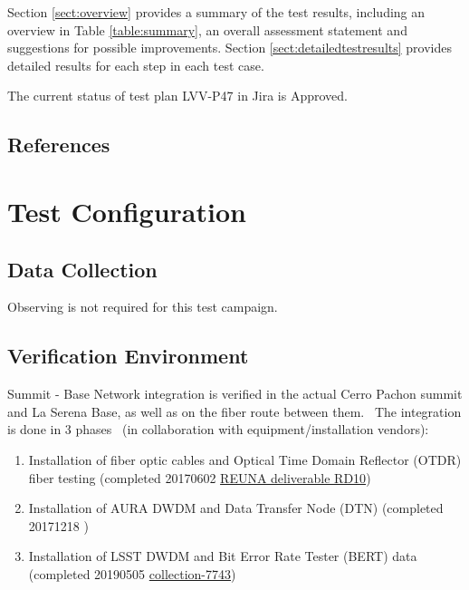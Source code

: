\documentclass[DM,lsstdraft,STR,toc]{lsstdoc}
\providecommand{\tightlist}{
  \setlength{\itemsep}{0pt}\setlength{\parskip}{0pt}}
\begin{document}
Section \ref{sect:overview} provides a summary of the test results, including an overview in Table \ref{table:summary}, an overall assessment statement and suggestions for possible improvements.
Section \ref{sect:detailedtestresults} provides detailed results for each step in each test case.

The current status of test plan LVV-P47 in Jira is Approved.

\subsection{References}
\label{sect:references}
\renewcommand{\refname}{}

\section{Test Configuration}
\label{sect:configuration}

\subsection{Data Collection}

  Observing is not required for this test campaign.

\subsection{Verification Environment}
\label{sect:hwconf}
  Summit - Base Network integration is verified in the actual Cerro Pachon
summit and La Serena Base, as well as on the fiber route between them.
~The integration is done in 3 phases ~(in collaboration with
equipment/installation vendors):

\begin{enumerate}
\tightlist
\item
  Installation of fiber optic cables and Optical Time Domain Reflector
  (OTDR) fiber testing (completed 20170602
  \href{https://docushare.lsstcorp.org/docushare/dsweb/Get/Document-26270/RD10\%20Report\%20of\%20delivery\%20of\%20LS\%20-\%20AG\%20fiber\%20from\%20Telefonica\%20to\%20REUNA.pdf}{REUNA
  deliverable RD10})
\item
  Installation of AURA DWDM and Data Transfer Node (DTN) (completed
  20171218 )
\item
  Installation of LSST DWDM and Bit Error Rate Tester (BERT) data
  (completed 20190505
  \href{https://docushare.lsstcorp.org/docushare/dsweb/View/Collection-7743}{collection-7743})
\end{enumerate}
\end{document}
